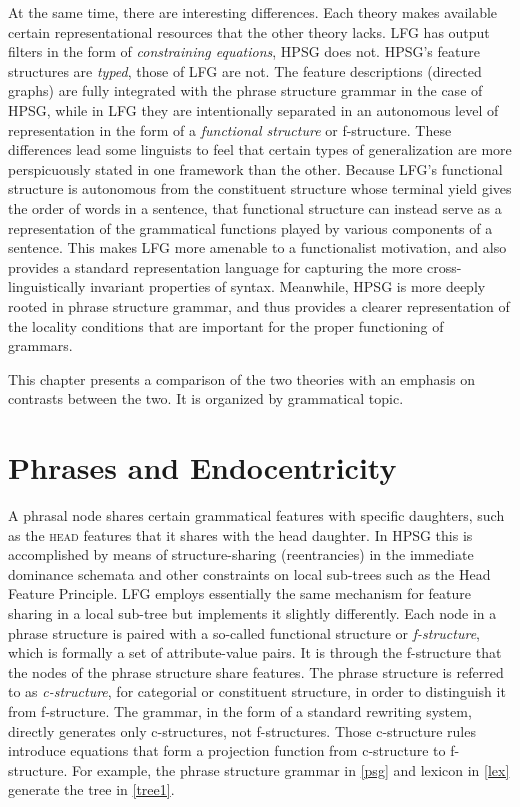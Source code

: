At the same time, there are interesting differences.  Each theory makes available certain representational resources that the other theory lacks.   LFG has output filters in the form of \textit{constraining equations}, HPSG does not.  HPSG's feature structures are \textit{typed}, those of LFG are not.  The feature descriptions (directed graphs) are fully integrated with the phrase structure grammar in the case of HPSG, while in LFG they are intentionally separated in an autonomous level of representation in the form of a \textit{functional structure} or f-structure.  These differences lead some linguists to feel that certain types of generalization are more perspicuously stated in one framework than the other.   Because LFG's functional structure is autonomous from the constituent structure whose terminal yield gives the order of words in a sentence, that functional structure can instead serve as a representation of the grammatical functions played by various components of a sentence.  This makes LFG more amenable to a functionalist motivation, and also provides a standard representation language for capturing the more cross-linguistically invariant properties of syntax.  Meanwhile, HPSG is more deeply rooted in phrase structure grammar, and thus provides a clearer representation of the locality conditions that are important for the proper functioning of grammars.  

This chapter presents a comparison of the two theories with an emphasis on contrasts between the two.  It is organized by grammatical topic.  


\section{Phrases and Endocentricity} 
A phrasal node shares certain grammatical features with specific daughters, such as the \textsc{head} features that it shares with the head daughter.  In HPSG this is accomplished
by means of structure-sharing (reentrancies) in the immediate dominance schemata and other 
constraints on local sub-trees such as the Head Feature Principle.  LFG employs essentially the same mechanism for feature sharing in a local sub-tree but implements it slightly differently.  Each node in a phrase structure is paired with a so-called functional structure or \textit{f-structure}, which is formally a set of attribute-value pairs.  It is through the f-structure that the nodes of the phrase structure share features.   The phrase structure is referred to as \textit{c-structure}, for categorial or constituent structure, in order to distinguish it from f-structure.  The grammar, in the form of a standard rewriting system, directly generates only c-structures, not f-structures.   Those c-structure rules introduce equations that form a projection function from c-structure to f-structure.  For example, the phrase structure grammar in \ref{psg} and lexicon in \ref{lex} generate the tree in \ref{tree1}.  


